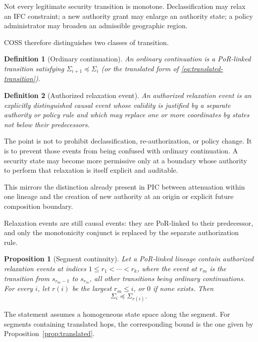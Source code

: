 \documentclass[10pt,twocolumn]{article}
\newcommand{\Model}{\textnormal{\textsc{COSS}}\xspace}
\newcommand{\state}{\Sigma}
\newtheorem{definition}{Definition}
\newtheorem{proposition}{Proposition}
\begin{document}
Not every legitimate security transition is monotone.  Declassification may
relax an IFC constraint; a new authority grant may enlarge an authority state;
a policy administrator may broaden an admissible geographic region.

\Model therefore distinguishes two classes of transition.

\begin{definition}[Ordinary continuation]
An ordinary continuation is a PoR-linked transition satisfying
$\state_{i+1}\preceq\state_i$ (or the translated form of
\eqref{eq:translated-transition}).
\end{definition}

\begin{definition}[Authorized relaxation event]
An authorized relaxation event is an explicitly distinguished causal event
whose validity is justified by a separate authority or policy rule and which
may replace one or more coordinates by states not below their predecessors.
\end{definition}

The point is not to prohibit declassification, re-authorization, or policy
change.  It is to prevent those events from being confused with ordinary
continuation.  A security state may become more permissive only at a boundary
whose authority to perform that relaxation is itself explicit and auditable.

This mirrors the distinction already present in PIC between attenuation within
one lineage and the creation of new authority at an origin or explicit future
composition boundary.

Relaxation events are still causal events: they are PoR-linked to their
predecessor, and only the monotonicity conjunct is replaced by the separate
authorization rule.

\begin{proposition}[Segment continuity]\label{prop:segment}
Let a PoR-linked lineage contain authorized relaxation events at indices
$1\le r_1<\cdots<r_k$, where the event at $r_m$ is the transition from
$s_{r_m-1}$ to $s_{r_m}$, all other transitions being ordinary
continuations. For every $i$, let $r(i)$ be the largest $r_m\le i$, or $0$
if none exists. Then
\begin{equation}
  \state_i\preceq\state_{r(i)}.
\end{equation}
\end{proposition}

The statement assumes a homogeneous state space along the segment. For segments
containing translated hops, the corresponding bound is the one given by
Proposition~\ref{prop:translated}.
\end{document}

